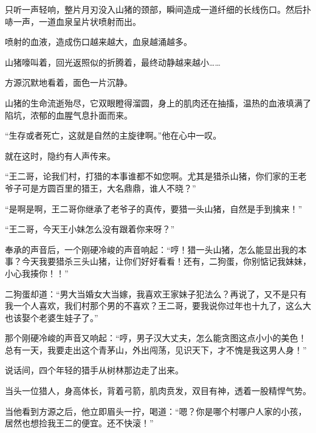 \begin{this_body}
只听一声轻响，整片月刃没入山猪的颈部，瞬间造成一道纤细的长线伤口。然后扑哧一声，一道血泉呈片状喷射而出。

喷射的血液，造成伤口越来越大，血泉越涌越多。

山猪嚎叫着，回光返照似的折腾着，最终动静越来越小……

方源沉默地看着，面色一片沉静。

山猪的生命流逝殆尽，它双眼瞪得溜圆，身上的肌肉还在抽搐，温热的血液填满了陷坑，浓郁的血腥气息扑面而来。

“生存或者死亡，这就是自然的主旋律啊。”他在心中一叹。

就在这时，隐约有人声传来。

“王二哥，论我们村，打猎的本事谁都不如您啊。尤其是猎杀山猪，你们家的王老爷子可是方圆百里的猎王，大名鼎鼎，谁人不晓？”

“是啊是啊，王二哥你继承了老爷子的真传，要猎一头山猪，自然是手到擒来！”

“王二哥，今天王小妹怎么没有跟着你来呀？”

奉承的声音后，一个刚硬冷峻的声音响起：“哼！猎一头山猪，怎么能显出我的本事？今天我要猎杀三头山猪，让你们好好看看！还有，二狗蛋，你别惦记我妹妹，小心我揍你！！”

二狗蛋却道：“男大当婚女大当嫁，我喜欢王家妹子犯法么？再说了，又不是只有我一个人喜欢，我们村那个男的不喜欢？王二哥，要我说你过年也十九了，这么大也该娶个老婆生娃子了。”

那个刚硬冷峻的声音又响起：“哼，男子汉大丈夫，怎么能贪图这点小小的美色！总有一天，我要走出这个青茅山，外出闯荡，见识天下，才不愧是我这男人身！”

说话间，四个年轻的猎手从树林那边走了出来。

当头一位猎人，身高体长，背着弓箭，肌肉贲发，双目有神，透着一股精悍气势。

当他看到方源之后，他立即眉头一拧，喝道：“嗯？你是哪个村哪户人家的小孩，居然也想捡我王二的便宜。还不快滚！”

\end{this_body}

